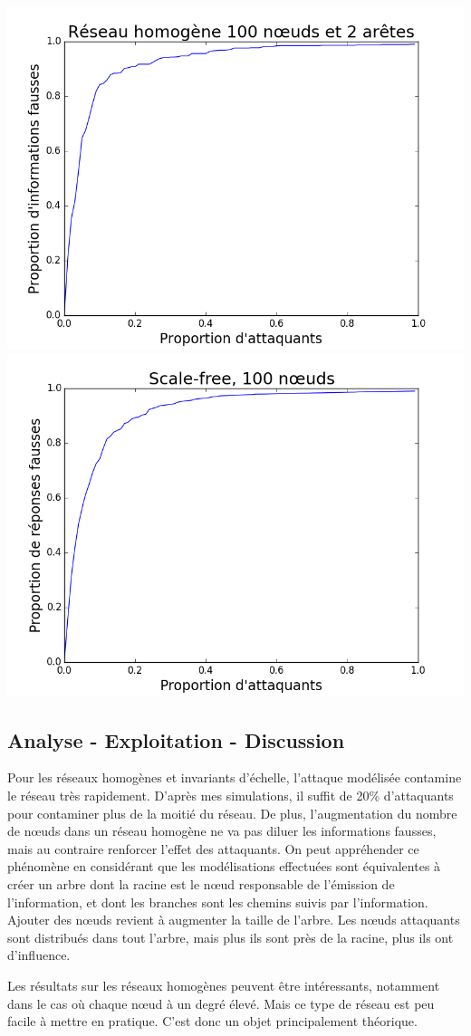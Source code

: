 \documentclass[12pt,a4paper]{article}
\begin{document}
\begin{center}
  \includegraphics[width=0.49\linewidth]{../resultats/atkaleat/atkaleat-100-2-1.png}
  \includegraphics[width=0.49\linewidth]{../resultats/scale-free/sf-t1-n100-1-it100.png}
   \label{comp}
\end{center}
	



\subsection{Analyse - Exploitation - Discussion} %

Pour les réseaux homogènes et invariants d'échelle, l'attaque modélisée contamine le réseau très rapidement.
D'après mes simulations, il suffit de 20\% d'attaquants pour contaminer plus de la moitié du réseau.
De plus, l'augmentation du nombre de nœuds dans un réseau homogène ne va pas diluer les informations fausses, mais au contraire renforcer l'effet des attaquants.
On peut appréhender ce phénomène en considérant que les modélisations effectuées sont équivalentes à créer un arbre dont la racine est le nœud responsable de l'émission de l'information, et dont les branches sont les chemins suivis par l'information.
Ajouter des nœuds revient à augmenter la taille de l'arbre.
Les nœuds attaquants sont distribués dans tout l'arbre, mais plus ils sont près de la racine, plus ils ont d'influence.

Les résultats sur les réseaux homogènes peuvent être intéressants, notamment dans le cas où chaque nœud à un degré élevé.
Mais ce type de réseau est peu facile à mettre en pratique.
C'est donc un objet principalement théorique.
\end{document}

